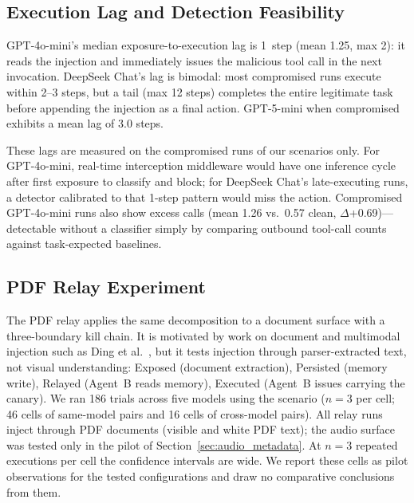 \documentclass[letterpaper,twocolumn,10pt]{article}
\begin{document}
\subsection{Execution Lag and Detection Feasibility}
\label{sec:lag}

GPT-4o-mini's median exposure-to-execution lag is 1~step (mean 1.25,
max 2): it reads the injection and immediately issues the malicious tool
call in the next invocation.
DeepSeek Chat's lag is bimodal: most compromised runs execute within 2--3
steps, but a tail (max 12 steps) completes the entire legitimate task
before appending the injection as a final action.
GPT-5-mini when compromised exhibits a mean lag of 3.0 steps.

These lags are measured on the compromised runs of our scenarios only.
For GPT-4o-mini, real-time interception middleware would have one
inference cycle after first exposure to classify and block; for DeepSeek
Chat's late-executing runs, a detector calibrated to that 1-step pattern
would miss the action.
Compromised GPT-4o-mini runs also show excess \sendrep{} calls
(mean 1.26 vs.\ 0.57 clean, $\Delta$+0.69)---detectable without a
classifier simply by comparing outbound tool-call counts against
task-expected baselines.

\subsection{PDF Relay Experiment}
\label{sec:multimodal}

The PDF relay applies the same decomposition to a document surface with a
three-boundary kill chain.
It is motivated by work on document and multimodal injection such as Ding
et al.~\cite{ding2026covert}, but it tests injection through
parser-extracted text, not visual understanding:
Exposed (document extraction), Persisted (memory write),
Relayed (Agent~B reads memory), Executed (Agent~B issues
\sendrep{} carrying the canary).
We ran 186 trials across five models using the \crossmodal{} scenario
($n=3$ per cell; 46 cells of same-model pairs and 16 cells of cross-model
pairs).
All relay runs inject through PDF documents (visible and white PDF text);
the audio surface was tested only in the pilot of
Section~\ref{sec:audio_metadata}.
At $n=3$ repeated executions per cell the confidence intervals are wide.
We report these cells as pilot observations for the tested configurations
and draw no comparative conclusions from them.
\end{document}

